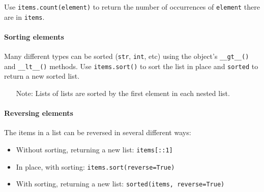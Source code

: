 Use \texttt{items.count(element)} to return the number of occurrences of \texttt{element} there are in \texttt{items}.

\paragraph{Sorting elements}\label{par:sorting_elements}

Many different types can be sorted (\texttt{str}, \texttt{int}, etc) using the object's \texttt{__gt__()} and \texttt{__lt__()} methods.
Use \texttt{items.sort()} to sort the list in place and \texttt{sorted} to return a new sorted list.

\begin{note}
    \begin{itemize}
        \item[Note:] Lists of lists are sorted by the first element in each nested list.
    \end{itemize}
\end{note}

\paragraph{Reversing elements}\label{par:reversing_elements}

The items in a list can be reversed in several different ways:

\begin{itemize}
    \item Without sorting, returning a new list: \texttt{items[::1]}
    \item In place, with sorting: \texttt{items.sort(reverse=True)}
    \item With sorting, returning a new list: \texttt{sorted(items, reverse=True)}
\end{itemize}

